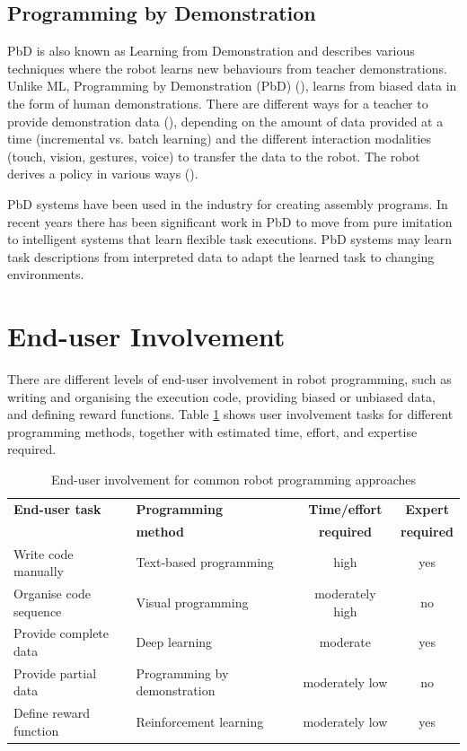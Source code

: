 \subsection{Programming by Demonstration}
PbD is also known as Learning from Demonstration and describes various techniques where the robot learns new behaviours from teacher demonstrations. 
Unlike ML, Programming by Demonstration (PbD) (\cite{billard2008robot}), learns from biased data in the form of human demonstrations.
There are different ways for a teacher to provide demonstration data (), depending on the amount of data provided at a time (incremental vs. batch learning) and the different interaction modalities (touch, vision, gestures, voice) to transfer the data to the robot. 
The robot derives a policy in various ways (). 

PbD systems have been used in the industry for creating assembly programs. 
In recent years there has been significant work in PbD to move from pure imitation to intelligent systems that learn flexible task executions. 
PbD systems may learn task descriptions from interpreted data to adapt the learned task to changing environments.

\section{End-user Involvement}
There are different levels of end-user involvement in robot programming, such as writing and organising the execution code, providing biased or unbiased data, and defining reward functions. Table \ref{tab:end-user involvement} shows user involvement tasks for different programming methods, together with estimated time, effort, and expertise required.

\begin{table}[ht]
	\centering
	\label{tab:end-user involvement}
	\begin{tabular}{llcc}
		\textbf{End-user task} & \textbf{Programming}   & \textbf{Time/effort} & \textbf{Expert} \\
		\textbf{}& \textbf{method}   & \textbf{ required} & \textbf{ required} \\ \hline
		Write code manually    & Text-based programming       & high                          & yes                      \\
		Organise code sequence & Visual programming           & moderately high               & no                       \\
		Provide complete data  & Deep learning                & moderate                      & yes                      \\
		Provide partial data   & Programming by demonstration & moderately low                & no                       \\
		Define reward function & Reinforcement learning       & moderately low                & yes                     
	\end{tabular}
\caption{End-user involvement for common robot programming approaches}
\end{table}

